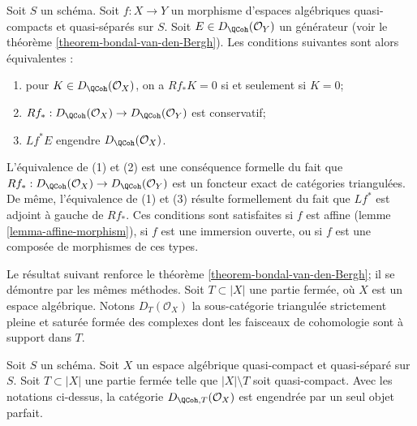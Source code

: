 \begin{remark}
\label{remark-pullback-generator}
Soit $S$ un sch\'ema. Soit $f:X\to Y$ un morphisme d'espaces alg\'ebriques
quasi-compacts et quasi-s\'epar\'es sur $S$. Soit
$E\in D_\QCoh(\mathcal{O}_Y)$ un g\'en\'erateur (voir le th\'eor\`eme
\ref{theorem-bondal-van-den-Bergh}). Les conditions suivantes sont alors
\'equivalentes :
\begin{enumerate}
\item pour $K\in D_\QCoh(\mathcal{O}_X)$, on a $Rf_*K=0$ si et seulement si
$K=0$;
\item $Rf_* : D_\QCoh(\mathcal{O}_X) \to D_\QCoh(\mathcal{O}_Y)$ est
conservatif;
\item $Lf^*E$ engendre $D_\QCoh(\mathcal{O}_X)$.
\end{enumerate}
L'\'equivalence de (1) et (2) est une cons\'equence formelle du fait que
$Rf_*:D_\QCoh(\mathcal{O}_X)\to D_\QCoh(\mathcal{O}_Y)$ est un foncteur exact
de cat\'egories triangul\'ees. De m\^eme, l'\'equivalence de (1) et (3) r\'esulte
formellement du fait que $Lf^*$ est adjoint \`a gauche de $Rf_*$. Ces
conditions sont satisfaites si $f$ est affine (lemme
\ref{lemma-affine-morphism}), si $f$ est une immersion ouverte, ou si $f$ est
une compos\'ee de morphismes de ces types.
\end{remark}

\noindent
Le r\'esultat suivant renforce le th\'eor\`eme
\ref{theorem-bondal-van-den-Bergh}; il se d\'emontre par les m\^emes m\'ethodes.
Soit $T\subset|X|$ une partie ferm\'ee, o\`u $X$ est un espace alg\'ebrique.
Notons $D_T(\mathcal{O}_X)$ la sous-cat\'egorie triangul\'ee strictement pleine
et satur\'ee form\'ee des complexes dont les faisceaux de cohomologie sont \`a
support dans $T$.

\begin{lemma}
\label{lemma-generator-with-support}
Soit $S$ un sch\'ema. Soit $X$ un espace alg\'ebrique quasi-compact et
quasi-s\'epar\'e sur $S$. Soit $T\subset|X|$ une partie ferm\'ee telle que
$|X|\setminus T$ soit quasi-compact. Avec les notations ci-dessus, la
cat\'egorie $D_{\QCoh,T}(\mathcal{O}_X)$ est engendr\'ee par un seul objet
parfait.
\end{lemma}

